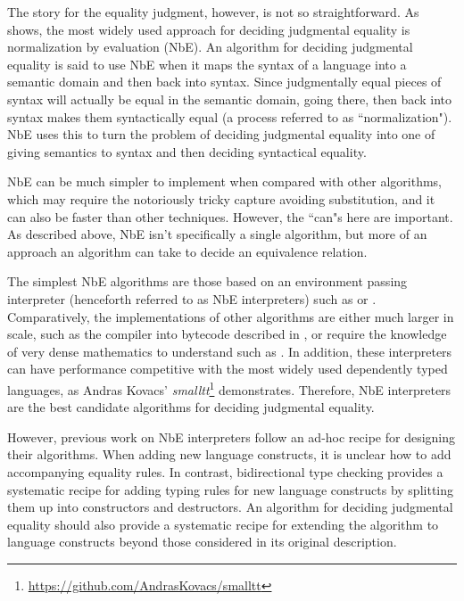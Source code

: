 The story for the equality judgment, however, is not so straightforward.
As \citet{Abel2013} shows, the most widely used approach for deciding judgmental equality is normalization by evaluation (NbE).
An algorithm for deciding judgmental equality is said to use NbE when it maps the syntax of a language into a semantic domain and then back into syntax.
Since judgmentally equal pieces of syntax will actually be equal in the semantic domain, going there, then back into syntax makes them syntactically equal (a process referred to as ``normalization").
NbE uses this to turn the problem of deciding judgmental equality into one of giving semantics to syntax and then deciding syntactical equality.

NbE can be much simpler to implement when compared with other algorithms, which may require the notoriously tricky capture avoiding substitution, and it can also be faster than other techniques.
However, the ``can"s here are important.
As described above, NbE isn't specifically a single algorithm, but more of an approach an algorithm can take to decide an equivalence relation.

The simplest NbE algorithms are those based on an environment passing interpreter (henceforth referred to as NbE interpreters) such as \citet{Coquand1996} or \citet{Chapman2005}.
Comparatively, the implementations of other algorithms are either much larger in scale, such as the compiler into bytecode described in \citet{Grgoire2002}, or require the knowledge of very dense mathematics to understand such as \citet{Ahman2013}.
In addition, these interpreters can have performance competitive with the most widely used dependently typed languages, as Andras Kovacs' \textit{smalltt}\footnote{\url{https://github.com/AndrasKovacs/smalltt}} demonstrates.
Therefore, NbE interpreters are the best candidate algorithms for deciding judgmental equality.

However, previous work on NbE interpreters follow an ad-hoc recipe for designing their algorithms.
When adding new language constructs, it is unclear how to add accompanying equality rules.
In contrast, bidirectional type checking provides a systematic recipe for adding typing rules for new language constructs by splitting them up into constructors and destructors.
An algorithm for deciding judgmental equality should also provide a systematic recipe for extending the algorithm to language constructs beyond those considered in its original description.

